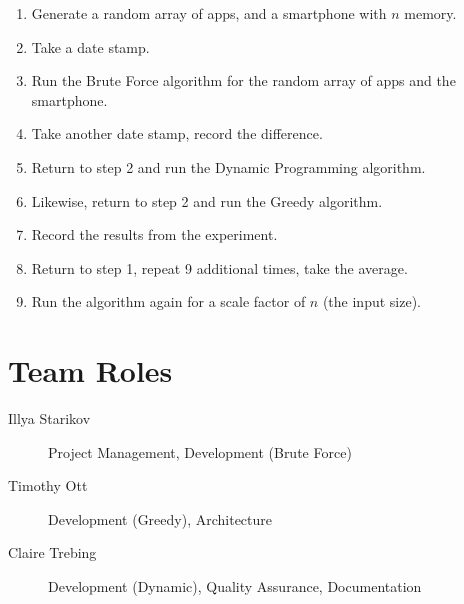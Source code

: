 \documentclass{article}
\begin{document}
\begin{enumerate}
    \item Generate a random array of apps, and a smartphone with $n$ memory.
    \item Take a date stamp.
    \item Run the Brute Force algorithm for the random array of apps and the smartphone.
    \item Take another date stamp, record the difference.
    \item Return to step 2 and run the Dynamic Programming algorithm.
    \item Likewise, return to step 2 and run the Greedy algorithm.
    \item Record the results from the experiment.
    \item Return to step 1, repeat 9 additional times, take the average.
    \item Run the algorithm again for a scale factor of $n$ (the input size).
\end{enumerate}


\section{Team Roles}
\begin{description}
    \item [Illya Starikov] Project Management, Development (Brute Force)
    \item [Timothy Ott] Development (Greedy), Architecture
    \item [Claire Trebing] Development (Dynamic), Quality Assurance,  Documentation
\end{description}
\end{document}
